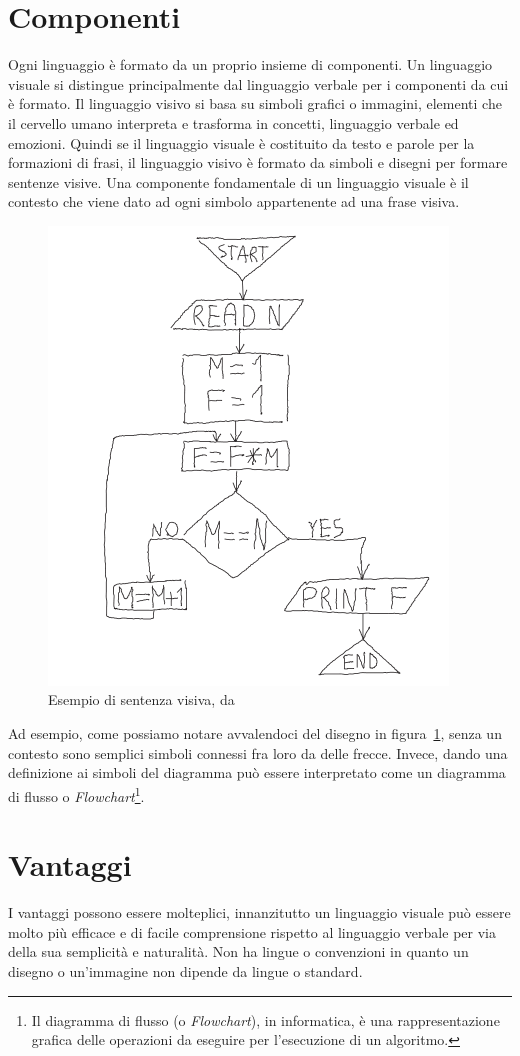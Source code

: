     \section{Componenti}
        Ogni linguaggio è formato da un proprio insieme di componenti. Un linguaggio visuale si distingue principalmente dal linguaggio verbale per i componenti da cui è formato. Il linguaggio visivo si basa su simboli grafici o immagini, elementi che il cervello umano interpreta e trasforma in concetti, linguaggio verbale ed emozioni. Quindi se il linguaggio visuale è costituito da testo e parole per la formazioni di frasi, il linguaggio visivo è formato da simboli e disegni per formare sentenze visive.
        Una componente fondamentale di un linguaggio visuale è il contesto che viene dato ad ogni simbolo appartenente ad una frase visiva.
        \newline
        \begin{figure}[htbp]
            \centering
            \includegraphics[scale=0.6]{Figure/diagram.PNG}
            \caption{Esempio di sentenza visiva, da~\cite{localcontext_recognition}}
            \label{fig:diagram}
        \end{figure}
        \newline
        Ad esempio, come possiamo notare avvalendoci del disegno in figura~\ref{fig:diagram}, senza un contesto sono semplici simboli connessi fra loro da delle frecce. Invece, dando una definizione ai simboli del diagramma può essere interpretato come un diagramma di flusso o \textit{Flowchart}\footnote{Il diagramma di flusso (o \textit{Flowchart}), in informatica, è una rappresentazione grafica delle operazioni da eseguire per l'esecuzione di un algoritmo.}.

    \section{Vantaggi}
        I vantaggi possono essere molteplici, innanzitutto un linguaggio visuale può essere molto più efficace e di facile comprensione rispetto al linguaggio verbale per via della sua semplicità e naturalità. Non ha lingue o convenzioni in quanto un disegno o un'immagine non dipende da lingue o standard.